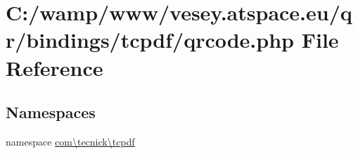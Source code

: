 \hypertarget{qrcode_8php}{\section{C\-:/wamp/www/vesey.atspace.\-eu/qr/bindings/tcpdf/qrcode.php File Reference}
\label{qrcode_8php}
}
\subsection*{Namespaces}
\begin{DoxyCompactItemize}
\item 
namespace \hyperlink{namespacecom_1_1tecnick_1_1tcpdf}{com\textbackslash{}tecnick\textbackslash{}tcpdf}
\end{DoxyCompactItemize}
